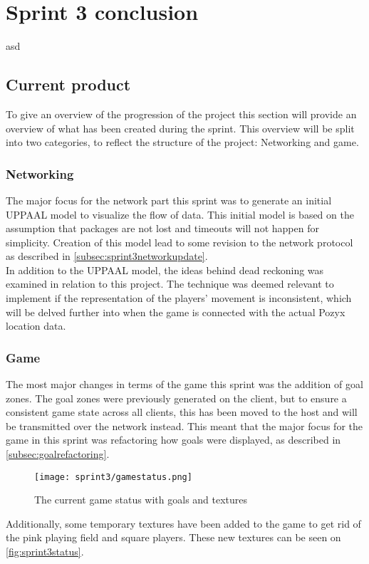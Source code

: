\section{Sprint 3 conclusion}\label{sec:sprint3conclusion}
asd

\subsection{Current product}
To give an overview of the progression of the project this section will provide an overview of what has been created during the sprint.
This overview will be split into two categories, to reflect the structure of the project: Networking and game.

\subsubsection{Networking}
The major focus for the network part this sprint was to generate an initial UPPAAL model to visualize the flow of data.
This initial model is based on the assumption that packages are not lost and timeouts will not happen for simplicity.
Creation of this model lead to some revision to the network protocol as described in \autoref{subsec:sprint3networkupdate}.\\
In addition to the UPPAAL model, the ideas behind dead reckoning was examined in relation to this project.
The technique was deemed relevant to implement if the representation of the players' movement is inconsistent, which will be delved further into when the game is connected with the actual Pozyx location data.

\subsubsection{Game}
The most major changes in terms of the game this sprint was the addition of goal zones.
The goal zones were previously generated on the client, but to ensure a consistent game state across all clients, this has been moved to the host and will be transmitted over the network instead.
This meant that the major focus for the game in this sprint was refactoring how goals were displayed, as described in \ref{subsec:goalrefactoring}.

\begin{figure}[H]
	\centering
	\texttt{[image: sprint3/gamestatus.png]}
	\caption{The current game status with goals and textures}
	\label{fig:sprint3status}
\end{figure}
\noindent
Additionally, some temporary textures have been added to the game to get rid of the pink playing field and square players.
These new textures can be seen on \autoref{fig:sprint3status}.

